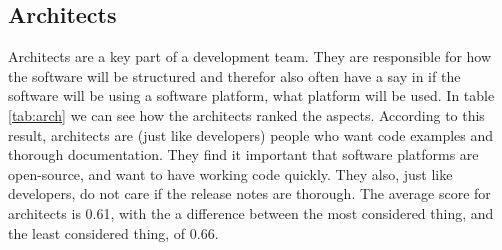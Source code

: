 \documentclass{cslthse-msc}
\begin{document}
    \subsection{Architects}
    Architects are a key part of a development team. They are responsible for how the software will be structured and therefor also often have a say in if the software will be using a software platform, what platform will be used. In table \ref{tab:arch} we can see how the architects ranked the aspects. According to this result, architects are (just like developers) people who want code examples and thorough documentation. They find it important that software platforms are open-source, and want to have working code quickly. They also, just like developers, do not care if the release notes are thorough. The average score for architects is 0.61, with the a difference between the most considered thing, and the least considered thing, of 0.66.
\end{document}
